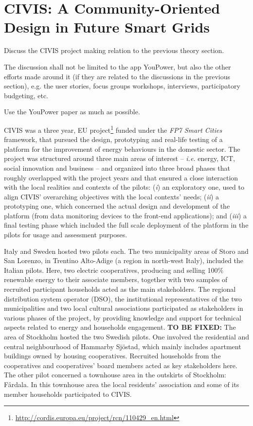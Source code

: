 \section{CIVIS: A Community-Oriented Design in Future Smart Grids}

\begin{svgraybox}
Discuss the CIVIS project making relation to the previous theory section. 

The discussion shall not be limited to the app YouPower, but also the other efforts made around it (if they are related to the discussions in the previous section), e.g. the user stories, focus groups workshops, interviews, participatory budgeting, etc. 

Use the YouPower paper as much as possible. 
\end{svgraybox}

CIVIS was a three year, EU project\footnote{\url{http://cordis.europa.eu/project/rcn/110429\_en.html}} funded under the \textit{FP7 Smart Cities} framework, that pursued the design,
prototyping and real-life testing of a platform for the improvement of energy behaviours in the domestic sector. The project was structured around three main areas
of interest – \textit{i.e.} energy, ICT, social innovation and business – and organized into three broad phases that roughly
overlapped with the project years and that ensured a close interaction with the local realities and contexts of
the pilots: (\textit{i}) an exploratory one, used to align CIVIS’ overarching objectives with the local contexts’ needs;
(\textit{ii}) a prototyping one, which concerned the actual design and development of the platform (from data monitoring devices to the
front-end applications); and (\textit{iii}) a final testing phase which included the full scale deployment of the platform in the pilots for usage and assessment purposes.

Italy and Sweden hosted two pilots each. 
The two municipality areas of Storo and San Lorenzo, in Trentino Alto-Adige (a region in north-west Italy), included the
Italian pilots. Here, two electric cooperatives, producing and selling 100\% renewable energy
to their associate members, together with two samples of recruited participant households acted as the main stakeholders.
The regional distribution system operator (DSO),
the institutional representatives of the two municipalities and two local cultural associations participated as
stakeholders in various phases of the project, by providing knowledge and support for technical aspects related
to energy and households engagement.
\textbf{TO BE FIXED:} The area of Stockholm hosted the two Swedish pilots. One involved the residential and central neighbourhood
of Hammarby Sj\"{o}stad, which mainly includes apartment buildings owned by housing cooperatives. Recruited households from the cooperatives and cooperatives' board members acted
as key stakeholders here. The other pilot concerned a townhouse area in the outskirts of Stockholm: F\aa{}rdala. In this townhouse
area the local residents’ association and some of its member households participated to CIVIS.

